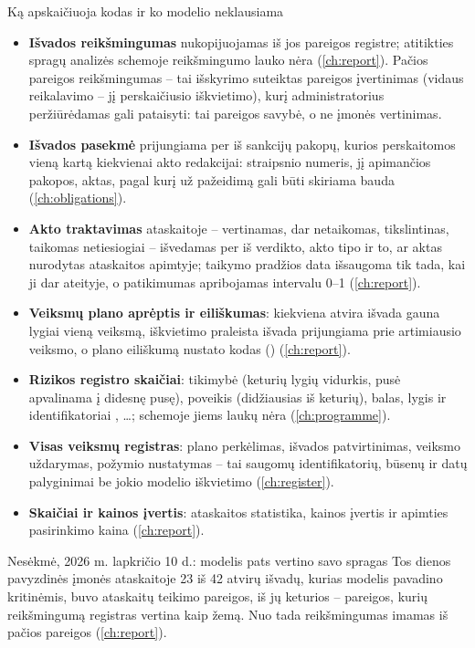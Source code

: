 \begin{codebox}{Ką apskaičiuoja kodas ir ko modelio neklausiama}
\begin{itemize}
  \item \textbf{Išvados reikšmingumas} nukopijuojamas iš jos pareigos registre; atitikties
    spragų analizės schemoje reikšmingumo lauko nėra (\cref{ch:report}). Pačios pareigos
    reikšmingumas -- tai išskyrimo suteiktas pareigos įvertinimas (vidaus reikalavimo --
    jį perskaičiusio iškvietimo), kurį administratorius peržiūrėdamas gali pataisyti: tai
    pareigos savybė, o ne įmonės vertinimas.
  \item \textbf{Išvados pasekmė} prijungiama per  iš sankcijų pakopų,
    kurios perskaitomos vieną kartą kiekvienai akto redakcijai: straipsnio numeris, jį
    apimančios pakopos, aktas, pagal kurį už pažeidimą gali būti skiriama bauda
    (\cref{ch:obligations}).
  \item \textbf{Akto traktavimas} ataskaitoje -- vertinamas, dar netaikomas, tikslintinas,
    taikomas netiesiogiai -- išvedamas per  iš verdikto, akto tipo ir to,
    ar aktas nurodytas ataskaitos apimtyje; taikymo pradžios
    data išsaugoma tik tada, kai ji dar ateityje, o patikimumas apribojamas intervalu 0--1
    (\cref{ch:report}).
  \item \textbf{Veiksmų plano aprėptis ir eiliškumas}: kiekviena atvira išvada gauna lygiai
    vieną veiksmą, iškvietimo praleista išvada prijungiama prie artimiausio veiksmo, o plano
    eiliškumą nustato kodas () (\cref{ch:report}).
  \item \textbf{Rizikos registro skaičiai}: tikimybė (keturių lygių vidurkis, pusė
    apvalinama į didesnę pusę), poveikis (didžiausias iš keturių), balas, lygis ir
    identifikatoriai , \ldots; schemoje jiems laukų nėra (\cref{ch:programme}).
  \item \textbf{Visas veiksmų registras}: plano perkėlimas, išvados patvirtinimas, veiksmo
    uždarymas, požymio  nustatymas -- tai saugomų identifikatorių, būsenų ir datų
    palyginimai be jokio modelio iškvietimo (\cref{ch:register}).
  \item \textbf{Skaičiai ir kainos įvertis}: ataskaitos statistika, kainos įvertis ir
    apimties pasirinkimo kaina (\cref{ch:report}).
\end{itemize}
\end{codebox}

\begin{lessonbox}{Nesėkmė, 2026 m. lapkričio 10 d.: modelis pats vertino savo spragas}
Tos dienos pavyzdinės įmonės ataskaitoje 23 iš 42 atvirų išvadų, kurias modelis pavadino
kritinėmis, buvo ataskaitų teikimo pareigos, iš jų keturios -- pareigos, kurių reikšmingumą
registras vertina kaip žemą. Nuo tada reikšmingumas imamas iš pačios pareigos
(\cref{ch:report}).
\end{lessonbox}

